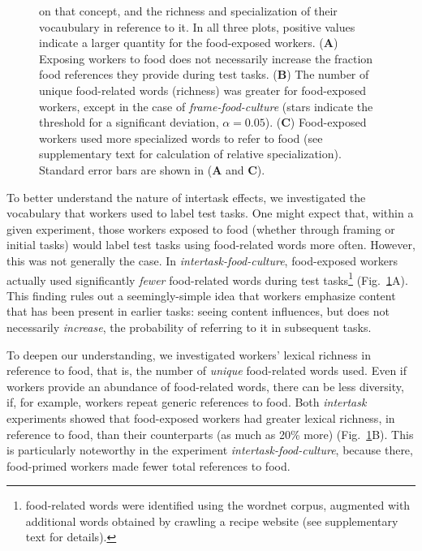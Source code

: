 \documentclass[12pt]{article}
\begin{document}
\begin{figure}
{		on that concept, and the richness and specialization of their 
		vocaubulary in reference to it.
		In all three plots, positive values indicate a larger quantity for 
		the food-exposed workers.
		(\textbf{A}) Exposing workers to food does not necessarily increase
		the fraction food references they provide during test tasks.
		(\textbf{B}) The number of unique food-related
		words (richness) was greater for food-exposed workers, except in the 
		case of \textit{frame-food-culture} (stars indicate the threshold
		for a significant deviation, $\alpha=0.05$). 
		(\textbf{C}) Food-exposed
		workers used more specialized words to refer to food (see 
		supplementary text for calculation of relative specialization).
		Standard error bars are shown in (\textbf{A} and \textbf{C}).
	}
	\label{fig:specificity}
\end{figure}

To better understand the nature of 
intertask effects, we investigated the vocabulary
that workers used to label test tasks. One might expect that, within a given 
experiment, those workers exposed to food (whether through framing or initial
tasks) would label test tasks using 
food-related words more often.  However, this was not generally 
the case. In \textit{intertask-food-culture}, food-exposed
workers actually used significantly \textit{fewer} food-related words 
during test tasks\footnote{
	food-related words were identified using the wordnet corpus, 
	augmented with additional words obtained by crawling a recipe website 
	(see supplementary text for details).
} (Fig.~\ref{fig:specificity}A).  This finding
rules out a seemingly-simple idea that workers emphasize
content that has been present in earlier tasks: seeing content 
influences, but does not necessarily \textit{increase}, the probability of 
referring to it in subsequent tasks.

To deepen our understanding, we investigated workers' lexical richness in 
reference to food, that is, the number of \textit{unique} food-related words
used.  Even if workers provide an abundance of food-related words, there
can be less diversity, if, for example, workers repeat generic references 
to food.
Both \textit{intertask} experiments showed that food-exposed workers had 
greater lexical richness, in reference to food, than their counterparts 
(as much as 20\% more) (Fig.~\ref{fig:specificity}B).  
This is particularly noteworthy in the experiment
\textit{intertask-food-culture}, because there,
food-primed workers made fewer total references to food.  
\end{document}
